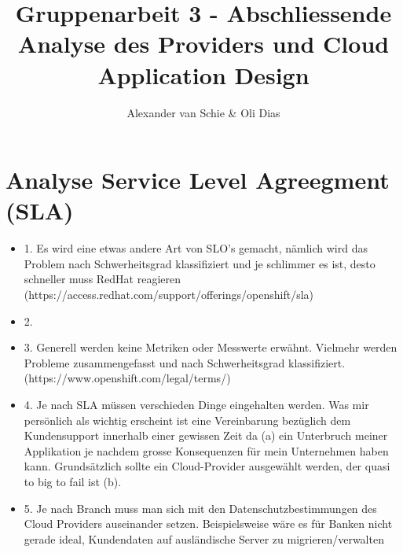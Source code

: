 \documentclass[12pt,a4paper]{article}
\author{Alexander van Schie \& Oli Dias}
\title{Gruppenarbeit 3 - Abschliessende Analyse des Providers und Cloud Application Design}
\begin{document}
\maketitle
\newpage
\tableofcontents
\newpage
\section{Analyse Service Level Agreegment (SLA)}
\begin{itemize}
    \item 1. Es wird eine etwas andere Art von SLO’s gemacht, nämlich wird das Problem nach Schwerheitsgrad klassifiziert und je schlimmer es ist, desto schneller muss RedHat reagieren (https://access.redhat.com/support/offerings/openshift/sla)
    \item 2.
    \item 3. Generell werden keine Metriken oder Messwerte erwähnt. Vielmehr werden Probleme zusammengefasst und nach Schwerheitsgrad klassifiziert. (https://www.openshift.com/legal/terms/)
    \item 4. Je nach SLA müssen verschieden Dinge eingehalten werden. Was mir persönlich als wichtig erscheint ist eine Vereinbarung bezüglich dem Kundensupport innerhalb einer gewissen Zeit da (a) ein Unterbruch meiner Applikation je nachdem grosse Konsequenzen für mein Unternehmen haben kann. Grundsätzlich sollte ein Cloud-Provider ausgewählt werden, der quasi to big to fail ist (b).
    \item 5. Je nach Branch muss man sich mit den Datenschutzbestimmungen des Cloud Providers auseinander setzen. Beispielsweise wäre es für Banken nicht gerade ideal, Kundendaten auf ausländische Server zu migrieren/verwalten
\end{itemize}
\end{document}
